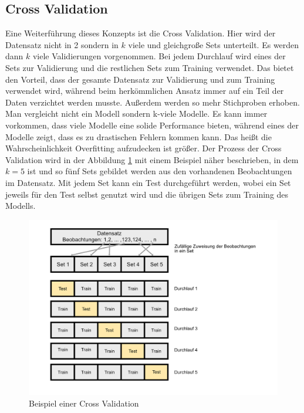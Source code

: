 \documentclass[a4paper,12pt]{thesis}
\begin{document}
\subsection{Cross Validation}

Eine Weiterführung dieses Konzepts ist die Cross Validation. Hier wird der Datensatz nicht in 2 sondern in $k$ viele und gleichgroße Sets unterteilt. Es werden dann $k$ viele Validierungen vorgenommen. Bei jedem Durchlauf wird eines der Sets zur Validierung und die restlichen Sets zum Training verwendet. Das bietet den Vorteil, dass der gesamte Datensatz zur Validierung und zum Training verwendet wird, während beim herkömmlichen Ansatz immer auf ein Teil der Daten verzichtet werden musste. Außerdem werden so mehr Stichproben erhoben. Man vergleicht nicht ein Modell sondern k-viele Modelle. Es kann immer vorkommen, dass viele Modelle eine solide Performance bieten, während eines der Modelle zeigt, dass es zu drastischen Fehlern kommen kann. Das heißt die Wahrscheinlichkeit Overfitting aufzudecken ist größer. Der Prozess der Cross Validation wird in der Abbildung \ref{CV1} mit einem Beispiel näher beschrieben, in dem $k=5$ ist und so fünf Sets gebildet werden aus den vorhandenen Beobachtungen im Datensatz. Mit jedem Set kann ein Test durchgeführt werden, wobei ein Set jeweils für den Test selbst genutzt wird und die übrigen Sets zum Training des Modells.

\begin{figure}[!ht]
	\centering
	\includegraphics[width=14cm]{Plots/CrossValidationBild.png}
	\caption{Beispiel einer Cross Validation}
	\label{CV1}
\end{figure}
\end{document}
